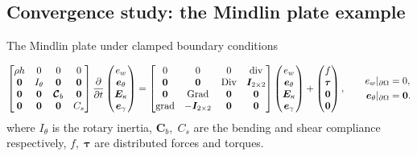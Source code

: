 \documentclass[aspectratio=169]{ISAE-Beamer}
\DeclareMathOperator*{\grad}{grad}
\DeclareMathOperator*{\Grad}{Grad}
\DeclareMathOperator*{\Div}{Div}
\renewcommand{\div}{\operatorname{div}}
\begin{document}
\subsection{Convergence study: the Mindlin plate example}


\begin{frame}{The Mindlin plate under clamped boundary conditions}

\begin{equation*}
	\begin{bmatrix}
	\rho h  & 0  & 0  & 0 \\
	\bm{0} & I_\theta &  \bm{0} & \bm{0}\\
	\bm{0}  & \bm{0}  & \bm{\mathcal{C}}_b  & \bm{0}\\
	\bm{0} & \bm{0} &  \bm{0} & C_s \\
	\end{bmatrix}
	\diffp{}{t}
	\begin{pmatrix}
	e_w \\
	\bm{e}_\theta \\
	\bm{E}_\kappa \\
	\bm{e}_{\gamma} \\
	\end{pmatrix} = 
	\begin{bmatrix}
	0  & 0  & 0  & \div \\
	\bm{0} & \bm{0} &  \Div & \bm{I}_{2 \times 2}\\
	\bm{0}  & \Grad  & \bm{0}  & \bm{0}\\
	\grad & -\bm{I}_{2 \times 2} &  \bm{0} & \bm{0} \\
	\end{bmatrix}
	\begin{pmatrix}
	e_w \\
	\bm{e}_{\theta} \\
	\bm{E}_{\kappa} \\
	\bm{e}_{\gamma} \\
	\end{pmatrix} + 
	\begin{pmatrix}
	f \\
	\bm{\tau} \\
	\bm{0} \\
	\bm{0} \\
	\end{pmatrix}, \qquad
	\begin{aligned}
	{e}_w\vert_{\partial\Omega} &= 0, \\
	\bm{e}_\theta\vert_{\partial\Omega} &= \bm{0}.
	\end{aligned}	
\end{equation*}
where $I_\theta$ is the rotary inertia, $\bm{C}_b, \; C_s$ are the bending and shear compliance  respectively, $f, \; \bm{\tau}$ are distributed forces and torques.
\vspace{.5cm}


\end{frame}
\end{document}
